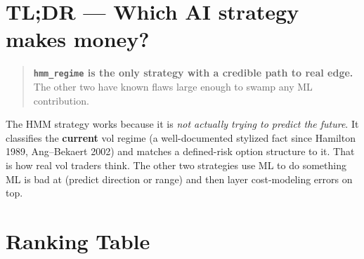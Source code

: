 \documentclass[11pt,a4paper]{article}
\begin{document}
\section*{TL;DR — Which AI strategy makes money?}

\begin{quote}
\textbf{\texttt{hmm\_regime} is the only strategy with a credible path to real edge.}\\
The other two have known flaws large enough to swamp any ML contribution.
\end{quote}

The HMM strategy works because it is \emph{not actually trying to predict the future}. It classifies the \textbf{current} vol regime (a well-documented stylized fact since Hamilton 1989, Ang--Bekaert 2002) and matches a defined-risk option structure to it. That is how real vol traders think. The other two strategies use ML to do something ML is bad at (predict direction or range) and then layer cost-modeling errors on top.

\section*{Ranking Table}
\end{document}
